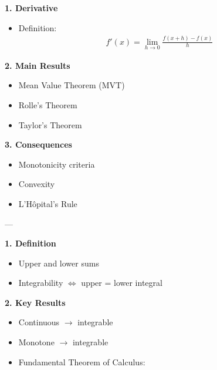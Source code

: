 \documentclass[12pt,a4paper]{report}
\begin{document}
\begin{description}
\item {}

	\begin{description}
    \item \textbf{1. Derivative}

		\begin{itemize}
        \item Definition:
  \begin{align*}
  f'(x) = \lim_{h \to 0} \frac{f(x+h) - f(x)}{h}
  \end{align*}
		\end{itemize}

    \item \textbf{2. Main Results}

		\begin{itemize}
        \item Mean Value Theorem (MVT)
        \item Rolle’s Theorem
        \item Taylor’s Theorem
		\end{itemize}

    \item \textbf{3. Consequences}

		\begin{itemize}
        \item Monotonicity criteria
        \item Convexity
        \item L’Hôpital’s Rule
		\end{itemize}

	\end{description}
---

\item {}

	\begin{description}
    \item \textbf{1. Definition}

		\begin{itemize}
        \item Upper and lower sums
        \item Integrability $\iff$ upper = lower integral
		\end{itemize}

    \item \textbf{2. Key Results}

		\begin{itemize}
        \item Continuous $\to$ integrable
        \item Monotone $\to$ integrable
        \item Fundamental Theorem of Calculus:
		\end{itemize}


\end{description}
\end{description}
\end{document}

